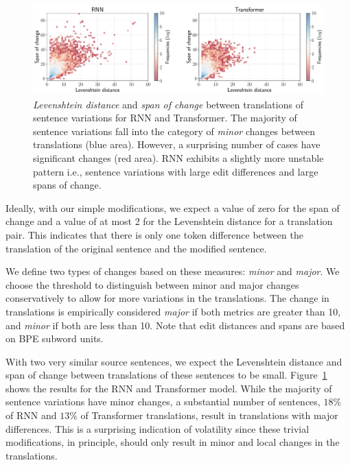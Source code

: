 \begin{figure}[tbh!]
\centering
\includegraphics[width=\textwidth]{07-research-05/figs/plot2.pdf}
\caption{\textit{Levenshtein distance} and \textit{span of change} between translations of sentence variations for RNN and Transformer. %
The majority of sentence variations fall into the category of \textit{minor} changes between translations (blue area). However, a surprising number of cases have significant changes (red area). RNN exhibits a slightly more unstable pattern i.e., sentence variations with large edit differences and large spans of change.
}
\label{fig1}
\end{figure}

Ideally, with our simple modifications, we expect a value of zero for the span of change and a value of at most 2 for the Levenshtein distance for a translation pair.
This indicates that there is only one token difference between the translation of the original sentence and the modified sentence. 

We define two types of changes based on these measures: \textit{minor} and \textit{major}.
We choose the threshold to distinguish between minor and major changes conservatively to allow for more variations in the translations.
The change in translations is empirically considered \textit{major} if both metrics are greater than 10, and \textit{minor} if both are less than 10. 
Note that edit distances and spans are based on BPE subword units.

With two very similar source sentences, we expect the Levenshtein distance and span of change between translations of these sentences to be small.
Figure~\ref{fig1} shows the results for the RNN and Transformer model. 
While the majority of sentence variations have minor changes, %
a substantial number of sentences, $18\%$ of RNN and $13\%$ of Transformer translations, result in translations with major differences. %
This is a surprising indication of volatility since these trivial modifications, in principle, should only result in minor and local changes in the translations. 



